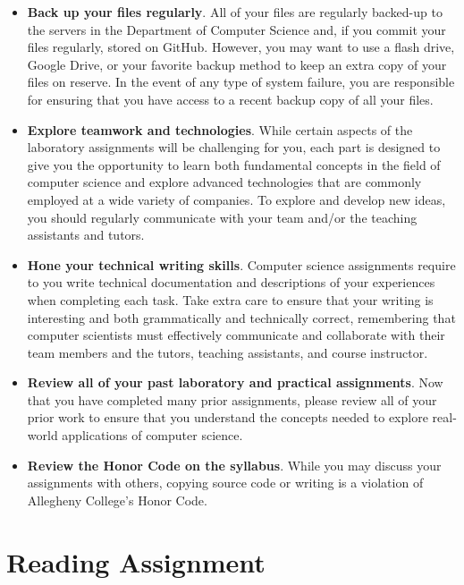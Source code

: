 \documentclass[11pt]{article}
\begin{document}
\begin{itemize}
\item {\bf Back up your files regularly}. All of your files are regularly backed-up to the servers in the Department of
  Computer Science and, if you commit your files regularly, stored on GitHub. However, you may want to use a flash
  drive, Google Drive, or your favorite backup method to keep an extra copy of your files on reserve. In the event of
  any type of system failure, you are responsible for ensuring that you have access to a recent backup copy of all your
  files.

\item {\bf Explore teamwork and technologies}. While certain aspects of the laboratory assignments will be challenging
  for you, each part is designed to give you the opportunity to learn both fundamental concepts in the field of computer
  science and explore advanced technologies that are commonly employed at a wide variety of companies. To explore and
  develop new ideas, you should regularly communicate with your team and/or the teaching assistants and tutors.

\item {\bf Hone your technical writing skills}. Computer science assignments require to you write technical
  documentation and descriptions of your experiences when completing each task. Take extra care to ensure that your
  writing is interesting and both grammatically and technically correct, remembering that computer scientists must
  effectively communicate and collaborate with their team members and the tutors, teaching assistants, and course
  instructor.

\item {\bf Review all of your past laboratory and practical assignments}. Now that you have completed many prior
  assignments, please review all of your prior work to ensure that you understand the concepts needed to explore
  real-world applications of computer science.

\item {\bf Review the Honor Code on the syllabus}. While you may discuss your assignments with others, copying source
  code or writing is a violation of Allegheny College's Honor Code.

\end{itemize}

\section*{Reading Assignment}
\end{document}
